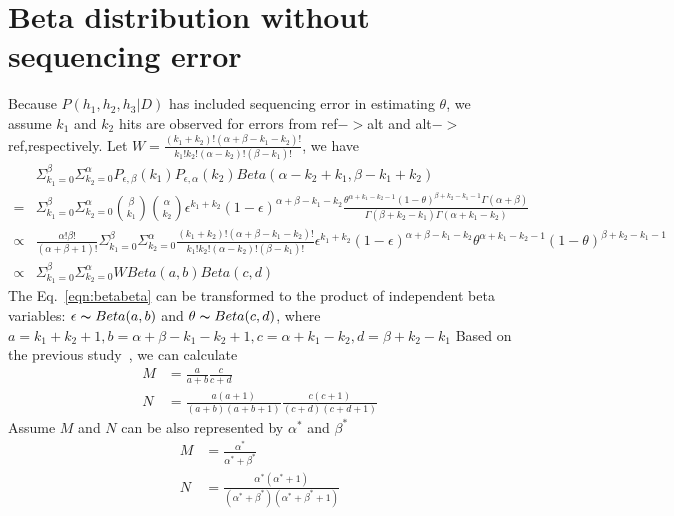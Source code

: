 \documentclass{article}
\begin{document}
\section{Beta distribution without sequencing error}
Because $P(h_1,h_2,h_3|D)$ has included sequencing error in estimating $\theta$, we assume $k_1$ and $k_2$ hits are observed for errors from ref$->$alt and alt$->$ref,respectively. Let $W=\frac{(k_1+k_2)!(\alpha+\beta-k_1-k_2)!}{k_1!k_2!(\alpha-k_2)!(\beta-k_1)!}$, we have
\begin{equation}
\begin{split}
&\Sigma_{k_1=0}^\beta \Sigma_{k_2=0}^\alpha P_{\epsilon,\beta}(k_1) P_{\epsilon,\alpha}(k_2) Beta(\alpha-k_2+k_1,\beta-k_1+k_2)\\
=&\Sigma_{k_1=0}^\beta \Sigma_{k_2=0}^\alpha \binom \beta {k_1} \binom \alpha {k_2} \epsilon^{k_1+k_2}(1-\epsilon)^{\alpha+\beta-k_1-k_2}\frac{\theta^{\alpha+k_1-k_2-1}(1-\theta)^{\beta+k_2-k_1-1}\Gamma(\alpha+\beta)}{\Gamma(\beta+k_2-k_1)\Gamma(\alpha+k_1-k_2)}\\
\varpropto& \frac{\alpha!\beta!}{(\alpha+\beta+1)!}\Sigma_{k_1=0}^\beta \Sigma_{k_2=0}^\alpha \frac{(k_1+k_2)!(\alpha+\beta-k_1-k_2)!}{k_1!k_2!(\alpha-k_2)!(\beta-k_1)!}\epsilon^{k_1+k_2}(1-\epsilon)^{\alpha+\beta-k_1-k_2}\theta^{\alpha+k_1-k_2-1}(1-\theta)^{\beta+k_2-k_1-1}\\
\varpropto&\Sigma_{k_1=0}^\beta \Sigma_{k_2=0}^\alpha WBeta(a,b)Beta(c,d)
\end{split}
\end{equation}\label{eqn:betabeta}
The Eq.~\ref{eqn:betabeta} can be transformed to the product of independent beta variables: $\epsilon \thicksim Beta(a,b)$ and $\theta \thicksim Beta(c,d)$, where $a=k_1+k_2+1,b=\alpha+\beta-k_1-k_2+1,c=\alpha+k_1-k_2,d=\beta+k_2-k_1$
Based on the previous study~\cite{betabeta}, we can calculate
\begin{equation}
\begin{split}
M&=\frac{a}{a+b}\frac{c}{c+d}\\
N&=\frac{a(a+1)}{(a+b)(a+b+1)}\frac{c(c+1)}{(c+d)(c+d+1)}
\end{split}
\end{equation}
Assume $M$ and $N$ can be also represented by $\alpha^\ast$ and $\beta^\ast$
\begin{equation}
\begin{split}
M&=\frac{\alpha^\ast}{\alpha^\ast+\beta^\ast}\\
N&=\frac{\alpha^\ast(\alpha^\ast+1)}{(\alpha^\ast+\beta^\ast)(\alpha^\ast+\beta^\ast+1)}
\end{split}
\end{equation}
\end{document}
